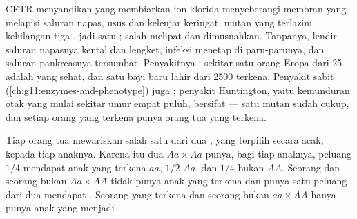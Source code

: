 \begin{example}\label{ex:g11:genes-and-disease:cf}
 CFTR menyandikan  yang membiarkan ion klorida menyeberangi
membran  yang melapisi saluran napas, usus dan kelenjar keringat.
 mutan yang terlazim kehilangan tiga , jadi satu ;  salah melipat dan dimusnahkan. Tanpanya, lendir
saluran napasnya kental dan lengket, infeksi menetap di paru-parunya,
dan saluran pankreasnya tersumbat. Penyakitnya : sekitar satu
orang Eropa dari 25 adalah  yang sehat, dan satu bayi baru lahir
dari 2500 terkena. Penyakit  sabit
(\cref{ch:g11:enzymes-and-phenotype}) juga ; penyakit
Huntington, yaitu kemunduran otak yang mulai sekitar umur empat puluh,
bersifat  --- satu  mutan sudah cukup, dan setiap orang yang
terkena punya orang tua yang terkena.
\end{example}

\begin{proposition}\label{prop:g11:genes-and-disease:recessive}
Tiap orang tua mewariskan salah satu dari dua , yang terpilih
secara acak, kepada tiap anaknya. Karena itu dua 
$Aa \times Aa$ punya, bagi tiap anaknya, peluang $1/4$ mendapat anak
yang terkena $aa$, $1/2$  $Aa$, dan $1/4$ bukan  $AA$.
Seorang  dan seorang bukan  $Aa \times AA$ tidak punya
anak yang terkena dan punya satu peluang dari dua mendapat .
Seorang yang terkena dan seorang bukan  $aa \times AA$ hanya
punya anak yang menjadi .
\end{proposition}
\admitted

